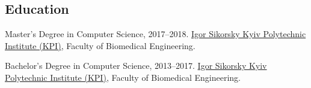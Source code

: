 \documentclass{nk-resume}
\begin{document}

\subsection*{Education}

\begin{samepage}
Master's Degree in Computer Science, 2017--2018.
\newline \href{https://kpi.ua/en}{Igor Sikorsky Kyiv Polytechnic Institute (KPI)}, Faculty of Biomedical Engineering.

\vspace*{7px}

Bachelor's Degree in Computer Science, 2013--2017.
\newline \href{https://kpi.ua/en}{Igor Sikorsky Kyiv Polytechnic Institute (KPI)}, Faculty of Biomedical Engineering.
\end{samepage}
\end{document}
